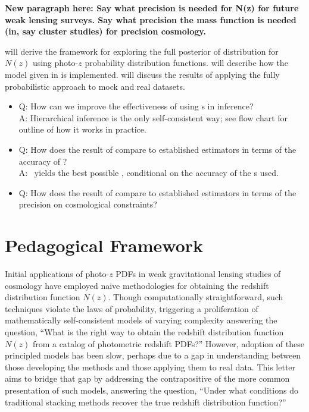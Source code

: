 \textbf{New paragraph here: Say what precision is needed for N(z) for future weak lensing surveys. Say what precision the mass function is needed (in, say cluster studies) for precision cosmology.}

 will derive the framework for exploring the full posterior of distribution for $N(z)$ using photo-$z$ probability distribution functions.  
 will describe how the model given in  is implemented.  
 will discuss the results of applying the fully probabilistic approach to mock and real datasets.

\begin{itemize}
	\item
	Q: How can we improve the effectiveness of using \pzpdf s in inference?\\
	A: Hierarchical inference is the only self-consistent way; see flow chart for outline of how it works in practice.
	\item
	Q: How does the result of \chippr compare to established estimators in terms of the accuracy of \nz ?\\
	A: \chippr\ yields the best possible \nz , conditional on the accuracy of the \pzpdf s used.
	\item
	Q: How does the result of \chippr compare to established estimators in terms of the precision on cosmological constraints?
\end{itemize}

\section{Pedagogical Framework}

Initial applications of photo-$z$ PDFs in weak gravitational lensing studies of cosmology have employed naive methodologies for obtaining the redshift distribution function $N(z)$.
Though computationally straightforward, such techniques violate the laws of probability, triggering a proliferation of mathematically self-consistent models of varying complexity answering the question, ``What is the right way to obtain the redshift distribution function $N(z)$ from a catalog of photometric redshift PDFs?''
However, adoption of these principled models has been slow, perhaps due to a gap in understanding between those developing the methods and those applying them to real data.
This letter aims to bridge that gap by addressing the contrapositive of the more common presentation of such models, answering the question, ``Under what conditions do traditional stacking methods recover the true redshift distribution function?''

